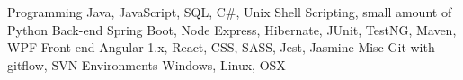 
\begin{cvskills}
    \cvskill
        {Programming}
        {Java, JavaScript, SQL, C\#, Unix Shell Scripting, small amount of Python}
    \cvskill
        {Back-end}
        {Spring Boot, Node Express, Hibernate, JUnit, TestNG, Maven, WPF}
    \cvskill
        {Front-end}
        {Angular 1.x, React, CSS, SASS, Jest, Jasmine}
    \cvskill
        {Misc}
        {Git with gitflow, SVN}
    \cvskill
        {Environments}
        {Windows, Linux, OSX}
\end{cvskills}